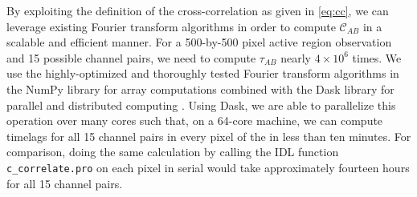 By exploiting the definition of the cross-correlation as given in \autoref{eq:cc}, we can leverage existing Fourier transform algorithms in order to compute $\mathcal{C}_{AB}$ in a scalable and efficient manner. For a 500-by-500 pixel active region observation and 15 possible channel pairs, we need to compute $\tau_{AB}$ nearly $4\times10^6$ times. We use the highly-optimized and thoroughly tested Fourier transform algorithms in the NumPy library for array computations \citep{oliphant_guide_2006} combined with the Dask library for parallel and distributed computing \citep{dask_development_team_dask_2016}. Using Dask, we are able to parallelize this operation over many cores such that, on a 64-core machine, we can compute timelags for all 15 channel pairs in every pixel of the \AR{} in less than ten minutes. For comparison, doing the same calculation by calling the IDL function \texttt{c\_correlate.pro} on each pixel in serial would take approximately fourteen hours for all 15 channel pairs.

